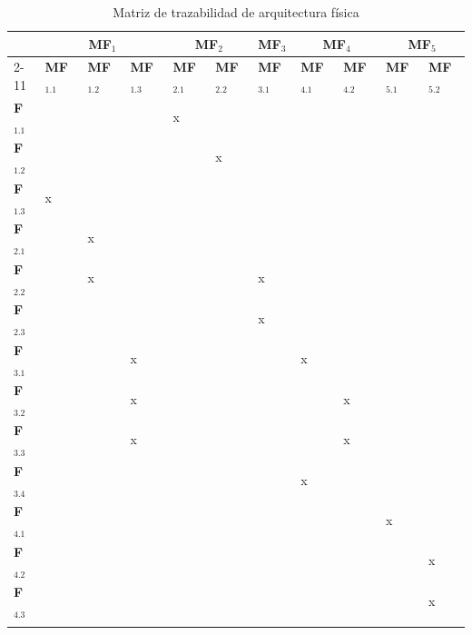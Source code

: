 \begin{center}
\footnotesize
    \begin{longtable}[!htb]{| m{3em} || m{3em} | m{3em}| m{3em}| m{3em}| m{3em}| m{3em}| m{3em}| m{3em}| m{3em}| m{3em}|}
    \hline
    & \multicolumn{3}{c|}{\textbf{MF}$_{1}$} & \multicolumn{2}{|c|}{\textbf{MF}$_{2}$} & \textbf{MF}$_{3}$ & \multicolumn{2}{|c|}{\textbf{MF}$_{4}$} & \multicolumn{2}{|c|}{\textbf{MF}$_{5}$}\\
    \cline{2-11}
    & \textbf{MF}$_{1.1}$ & \textbf{MF}$_{1.2}$ & \textbf{MF}$_{1.3}$ & \textbf{MF}$_{2.1}$ & \textbf{MF}$_{2.2}$ & \textbf{MF}$_{3.1}$ & \textbf{MF}$_{4.1}$ & \textbf{MF}$_{4.2}$ & \textbf{MF}$_{5.1}$ & \textbf{MF}$_{5.2}$ \\
    \hline\hline
    \textbf{F}$_{1.1}$ & & & & \cellcolor{gr}x & & & & & & \\
    \hline
    \textbf{F}$_{1.2}$ & & & & & \cellcolor{gr}x & & & & & \\
    \hline
    \textbf{F}$_{1.3}$ & \cellcolor{gr}x& & & & & & & & & \\
    \hline
    \textbf{F}$_{2.1}$ & & \cellcolor{gr}x& & & & & & & & \\
    \hline
    \textbf{F}$_{2.2}$ & & \cellcolor{gr}x& & & & \cellcolor{gr}x & & & & \\
    \hline
    \textbf{F}$_{2.3}$ & & & & & & \cellcolor{gr}x & & & & \\
    \hline
    \textbf{F}$_{3.1}$ & & & \cellcolor{gr}x & & & & \cellcolor{gr}x & & & \\
    \hline
    \textbf{F}$_{3.2}$ & & & \cellcolor{gr}x & & & & & \cellcolor{gr}x & & \\
    \hline
    \textbf{F}$_{3.3}$ & & & \cellcolor{gr}x & & & & & \cellcolor{gr}x & & \\
    \hline
    \textbf{F}$_{3.4}$ & & & & & & & \cellcolor{gr}x & & & \\
    \hline
    \textbf{F}$_{4.1}$ & & & & & & & & & \cellcolor{gr}x & \\
    \hline
    \textbf{F}$_{4.2}$ & & & & & & & & & & \cellcolor{gr}x \\
    \hline
    \textbf{F}$_{4.3}$ & & & & & & & & & & \cellcolor{gr}x \\
    \hline

    \caption{\footnotesize Matriz de trazabilidad de arquitectura física}
    \label{tab:MatTrazArquiFis}
    \end{longtable}
\end{center}
